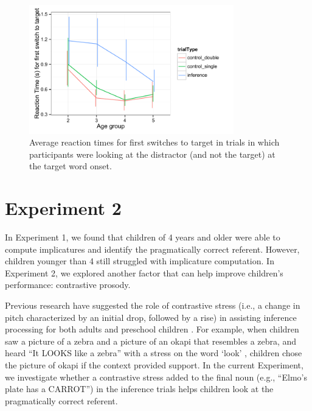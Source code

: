 \documentclass[10pt,letterpaper]{article}
\begin{document}
\begin{figure}
\begin{center} 
\includegraphics[width=3.5in]{figures/150116-0-rt_age.pdf}
\caption{\label{fig:rt} Average reaction times for first switches to target in trials in which participants were looking at the distractor (and not the target) at the target word onset.}
\end{center} 
\end{figure}

\section{Experiment 2}

In Experiment 1, we found that children of 4 years and older were able to compute implicatures and identify the pragmatically correct referent. However, children younger than 4 still struggled with implicature computation. In Experiment 2, we explored another factor that can help improve children's performance: contrastive prosody.

Previous research have suggested the role of contrastive stress (i.e., a change in pitch characterized by an initial drop, followed by a rise) in assisting inference processing for both adults \cite{ito2008anticipatory} and preschool children \cite{kurumada1contextual}. For example, when children saw a picture of a zebra and a picture of an okapi that resembles a zebra, and heard ``It LOOKS like a zebra'' with a stress on the word `look' , children chose the picture of okapi if the context provided support. In the current Experiment, we investigate whether a contrastive stress added to the final noun (e.g., ``Elmo's plate has a CARROT'') in the inference trials helps children look at the pragmatically correct referent.
\end{document}
